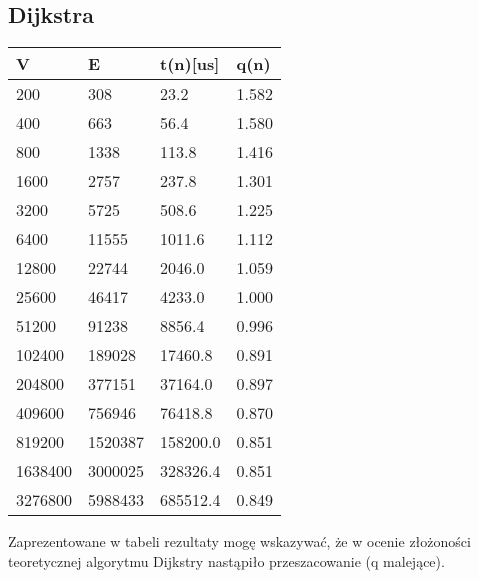 \documentclass[11pt,a4paper]{article}
\begin{document}
\subsection{Dijkstra}
\begin{longtable}{| m{1.7cm}| m{1.7cm} | m{1.7cm} | m{1.2cm} |}
\hline
V    &      E    &      t(n)[us] &  q(n)  \\ \hline
200  &      308  &      23.2  &     1.582 \\ \hline
400  &      663  &      56.4  &     1.580 \\ \hline
800  &      1338  &     113.8  &    1.416 \\ \hline
1600  &     2757  &     237.8  &    1.301 \\ \hline
3200  &     5725  &     508.6  &    1.225 \\ \hline
6400  &     11555  &    1011.6  &   1.112 \\ \hline
12800  &    22744  &    2046.0  &   1.059 \\ \hline
25600  &    46417  &    4233.0  &   1.000 \\ \hline
51200  &    91238  &    8856.4  &   0.996 \\ \hline
102400  &   189028  &   17460.8  &  0.891 \\ \hline
204800  &   377151  &   37164.0  &  0.897 \\ \hline
409600  &   756946  &   76418.8  &  0.870 \\ \hline
819200  &   1520387  &  158200.0  & 0.851 \\ \hline
1638400  &  3000025  &  328326.4  & 0.851 \\ \hline
3276800  &  5988433  &  685512.4  & 0.849 \\ \hline
\end{longtable}

Zaprezentowane w tabeli rezultaty mogę wskazywać, że w ocenie złożoności teoretycznej algorytmu Dijkstry
nastąpiło przeszacowanie (q malejące).
\end{document}

